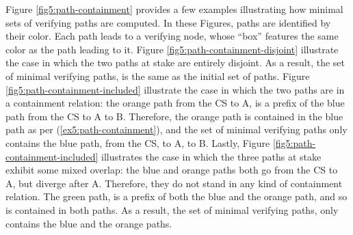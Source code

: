 Figure \ref{fig5:path-containment} provides a few examples illustrating how minimal sets of verifying paths are computed. In these Figures, paths are identified by their color. Each path leads to a verifying node, whose ``box'' features the same color as the path leading to it. Figure \ref{fig5:path-containment-disjoint} illustrate the case in which the two paths at stake are entirely disjoint. As a result, the set of minimal verifying paths, is the same as the initial set of paths. Figure \ref{fig5:path-containment-included} illustrate the case in which
the two paths are in a containment relation: the orange path from the CS to A, is a prefix of the blue path from the CS to A to B. Therefore, the orange path is contained in the blue path as per (\ref{ex5:path-containment}), and the set of minimal verifying paths only contains the blue path, from the CS, to A, to B. Lastly, Figure \ref{fig5:path-containment-included} illustrates the case in which the three paths at stake exhibit some mixed overlap: the blue and orange paths both go from the CS to A, but diverge after A. Therefore, they do not stand in any kind of containment relation. The green path, is a prefix of both the blue and the orange path, and so is contained in both paths. As a result, the set of minimal verifying paths, only contains the blue and the orange paths.
